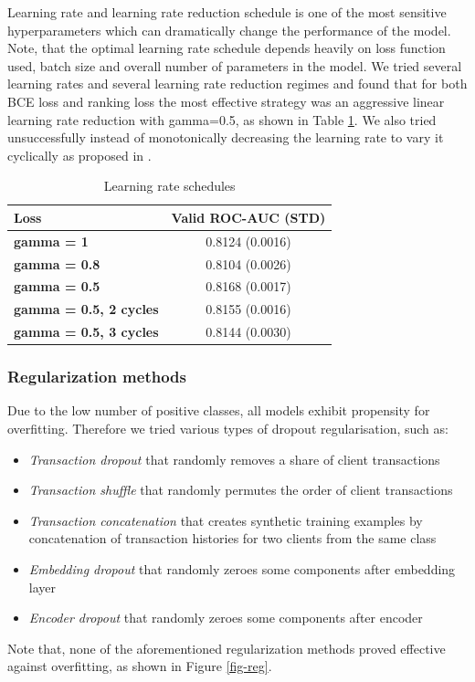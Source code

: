 \documentclass[sigconf]{acmart}
\begin{document}
Learning rate and learning rate reduction schedule is one of the most sensitive hyperparameters which can dramatically change the performance of the model.
Note, that the optimal learning rate schedule depends heavily on loss function used, batch size and overall number of parameters in the model. 
We tried several learning rates and several learning rate reduction regimes and found that for both BCE loss and ranking loss the most effective strategy was an aggressive linear learning rate reduction with gamma=0.5, as shown in Table \ref{tab-lr}. We also tried unsuccessfully instead of monotonically decreasing the learning rate to vary it cyclically as proposed in \cite{smith2017cyclical}.

\begin{table}[ht]
\caption{Learning rate schedules}
\begin{tabular}{ | l | c |  }
\hline
\textbf{Loss} & \textbf{Valid ROC-AUC (STD)} \\
\hline
\textbf{gamma = 1} & 0.8124 (0.0016)  \\
\textbf{gamma = 0.8} & 0.8104 (0.0026)  \\
\textbf{gamma = 0.5} & 0.8168 (0.0017)  \\
\textbf{gamma = 0.5, 2 cycles} & 0.8155 (0.0016)  \\
\textbf{gamma = 0.5, 3 cycles} & 0.8144 (0.0030)  \\
\hline
\end{tabular}
\label{tab-lr}
\end{table}

\subsubsection{Regularization methods}

Due to the low number of positive classes, all models exhibit propensity for overfitting. Therefore we tried various types of dropout regularisation, such as:
\begin{itemize}
\item \textit{Transaction dropout} that randomly removes a share of client transactions
\item \textit{Transaction shuffle} that randomly permutes the order of client transactions
\item \textit{Transaction concatenation} that creates synthetic training examples by concatenation of transaction histories for two clients from the same class
\item \textit{Embedding dropout} that randomly zeroes some components after embedding layer
\item \textit{Encoder dropout} that randomly zeroes some components after encoder
\end{itemize}
Note that, none of the aforementioned regularization methods proved effective against overfitting, as shown in Figure \ref{fig-reg}.
\end{document}
